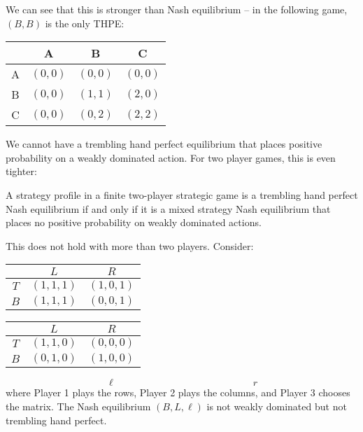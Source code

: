 \documentclass[10pt]{article}
\begin{document}
We can see that this is stronger than Nash equilibrium -- in the following game, $(B,B)$ is the only THPE:
\begin{center}
	\begin{tabular}{c|ccc}
		& A & B & C \\\hline
		A & $(0,0)$ & $(0,0)$ & $(0,0)$ \\
		B & $(0,0)$ & $(1,1)$ & $(2,0)$ \\
		C & $(0,0)$ & $(0,2)$ & $(2,2)$ \\
	\end{tabular}
\end{center}

\begin{remark}
	We cannot have a trembling hand perfect equilibrium that places positive probability on a weakly dominated action. For two player games, this is even tighter:
\end{remark}
\begin{proposition}
	A strategy profile in a finite two-player strategic game is a trembling hand perfect Nash equilibrium if and only if it is a mixed strategy Nash equilibrium that places no positive probability on weakly dominated actions.
\end{proposition}
\begin{remark}
	This does not hold with more than two players. Consider:
	\begin{center}
		\begin{tabular}{c|cc}
			& $L$ & $R$ \\\hline 
			$T$ & $(1,1,1)$ & $(1,0,1)$ \\
			$B$ & $(1,1,1)$ & $(0,0,1)$
		\end{tabular}
		\qquad
		\begin{tabular}{c|cc}
			& $L$ & $R$ \\\hline 
			$T$ & $(1,1,0)$ & $(0,0,0)$ \\
			$B$ & $(0,1,0)$ & $(1,0,0)$
		\end{tabular}
	\end{center}
	\[
	\ell \qquad\qquad\qquad\qquad\qquad\qquad\qquad r
	\]
	where Player 1 plays the rows, Player 2 plays the columns, and Player 3 chooses the matrix. The Nash equilibrium $(B,L,\ell)$ is not weakly dominated but not trembling hand perfect.
\end{remark}
\end{document}
